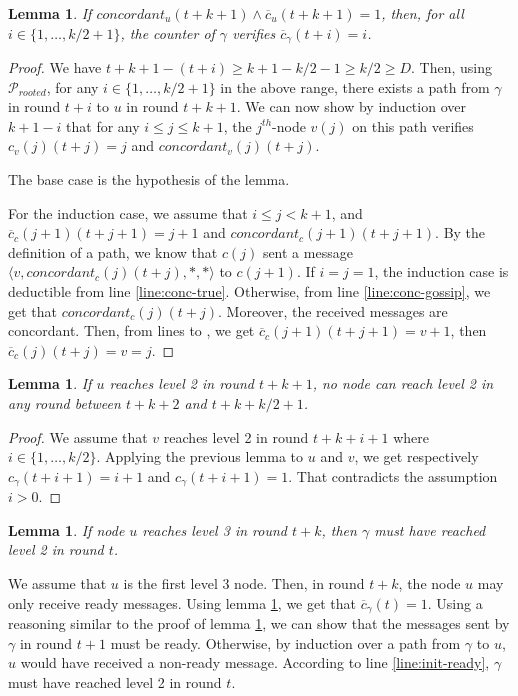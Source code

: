 \documentclass[11pt,letterpaper]{article}
\renewcommand{\leq}{\leqslant}
\renewcommand{\geq}{\geqslant}
\newtheorem{lem}[thm]{Lemma}
\newcommand{\cent}{\gamma}
\begin{document}
\begin{lem} \label{lem:conc-safety}
	If $concordant_u(t+k+1) \wedge \overline{c}_u(t+k+1) = 1$, then, for all $i \in \{1, \dots, k/2+1\}$, the counter of $\cent$ verifies $\overline{c}_\cent(t+i) = i$.
\end{lem}
\begin{proof}
	We have $t+k+1 - (t+i) \geq k+1 - k/2 - 1 \geq k/2 \geq D$.
	Then, using $\mathcal{P}_{rooted}$, for any $i \in \{1, \dots, k/2+1\}$ in the above range, there exists a path from $\cent$ in round $t+i$ to $u$ in round $t+k+1$. 
	We can now show by induction over $k+1-i$ that for any $i \leq j \leq k+1$, the $j^{th}$-node $v(j)$ on this path verifies $c_v(j)(t+j) = j$ and $concordant_v(j)(t+j)$.

	The base case is the hypothesis of the lemma.

	For the induction case, we assume that $i \leq j < k+1$, and $\overline{c}_c(j+1)(t+j+1) = j+1$ and $concordant_c(j+1)(t+j+1)$.
	By the definition of a path, we know that $c(j)$ sent a message $\langle v, concordant_c(j)(t+j), *, * \rangle$ to $c(j+1)$.
	If $i = j = 1$, the induction case is deductible from line \ref{line:conc-true}.
	Otherwise, from line \ref{line:conc-gossip}, we get that $concordant_c(j)(t+j)$. Moreover, the received messages are concordant.
	Then, from lines \label{line:min-z} to \label{line:min-z-end}, we get $\overline{c}_c(j+1)(t+j+1) = v+1$, then $\overline{c}_c(j)(t+j) = v = j$.
\end{proof}

\begin{lem} \label{lem:no-close-level2}
	If $u$ reaches level 2 in round $t+k+1$, no node can reach level 2 in any round between $t+k+2$ and $t+k+k/2+1$.
\end{lem}
\begin{proof}
	We assume that $v$ reaches level 2 in round $t+k+i+1$ where $i \in \{1, \dots, k/2\}$.
	Applying the previous lemma to $u$ and $v$, we get respectively $c_\cent(t+i+1) = i+1$ and $c_\cent(t+i+1) = 1$.
	That contradicts the assumption $i > 0$.
\end{proof}

\begin{lem} \label{lem:ready-safety}
	If node $u$ reaches level 3 in round $t+k$, then $\cent$ must have reached level 2 in round $t$.
\end{lem}
\begin{peoof}
	We assume that $u$ is the first level 3 node. Then, in round $t+k$, the node $u$ may only receive ready messages.
	Using lemma \ref{lem:conc-safety}, we get that $\overline{c}_\cent(t) = 1$.
	Using a reasoning similar to the proof of lemma \ref{lem:conc-safety}, we can show that the messages sent by $\cent$ in round $t+1$ must be ready.
	Otherwise, by induction over a path from $\cent$ to $u$, $u$ would have received a non-ready message.
	According to line \ref{line:init-ready}, $\cent$ must have reached level 2 in round $t$.
\end{peoof}
\end{document}
